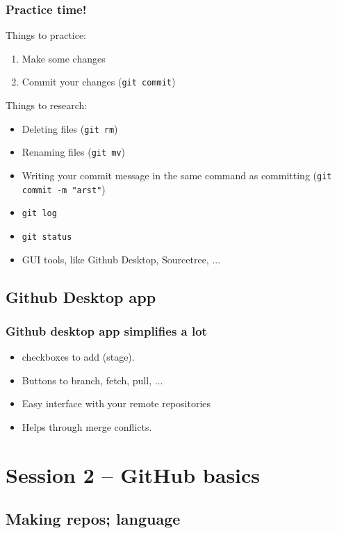 \documentclass[14pt,aspectratio=1610]{beamer} %
\newcommand{\fframe}[2]{
   \begin{frame}
\frametitle{#1}
#2
\end{frame}
}
\begin{document}
\fframe{Practice time!}
{
Things to practice:
	\begin{enumerate}
		\item Make some changes
		\item Commit your changes ({\tt git commit})
	\end{enumerate}

	Things to research:
	\begin{itemize}
		\item Deleting files ({\tt git rm})
		\item Renaming files ({\tt git mv})
		\item Writing your commit message in the same command as committing ({\tt git commit -m "arst"})
		\item {\tt git log}
		\item {\tt git status}
		\item GUI tools, like Github Desktop, Sourcetree, ...
	\end{itemize}
}



\subsection{Github Desktop app}

\fframe{Github desktop app simplifies a lot}
{
\begin{itemize}
	\item checkboxes to add (stage).
	\item Buttons to branch, fetch, pull, ...
	\item Easy interface with your remote repositories
	\item Helps through merge conflicts.
\end{itemize}
}
























\section{Session 2 -- GitHub basics}

\subsection{Making repos; language}
\end{document}
